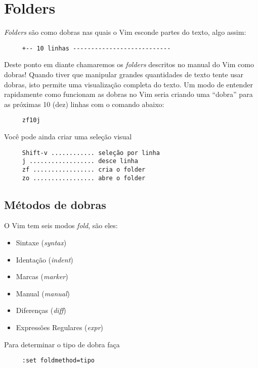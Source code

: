 
\chapter{Folders}
\label{cha:Folders}
{\em Folders} são como dobras nas quais o Vim esconde partes do texto,
algo assim:
\begin{verbatim}
     +-- 10 linhas ---------------------------
\end{verbatim}

Deste ponto em diante chamaremos os {\em folders} descritos no manual do
Vim como dobras!  Quando tiver que manipular grandes quantidades de
texto tente usar dobras, isto permite uma visualização completa do
texto.  Um modo de entender rapidamente como funcionam as dobras no
Vim seria criando uma ``dobra'' para as próximas 10 (dez) linhas com o
comando abaixo:
\begin{verbatim}
     zf10j
\end{verbatim}

Você pode ainda criar uma seleção visual
\begin{verbatim}
     Shift-v ............ seleção por linha
     j .................. desce linha
     zf ................. cria o folder
     zo ................. abre o folder
\end{verbatim}

\section{Métodos de dobras }
\label{Métodos de dobras }
O Vim tem seis modos {\em fold}, são eles:
\begin{itemize}
\item Sintaxe ({\em syntax})
\item Identação ({\em indent})
\item Marcas ({\em marker})
\item Manual ({\em manual})
\item Diferenças ({\em diff})
\item Expressões Regulares ({\em expr})
\end{itemize}

Para determinar o tipo de dobra faça
\begin{verbatim}
     :set foldmethod=tipo
\end{verbatim}


